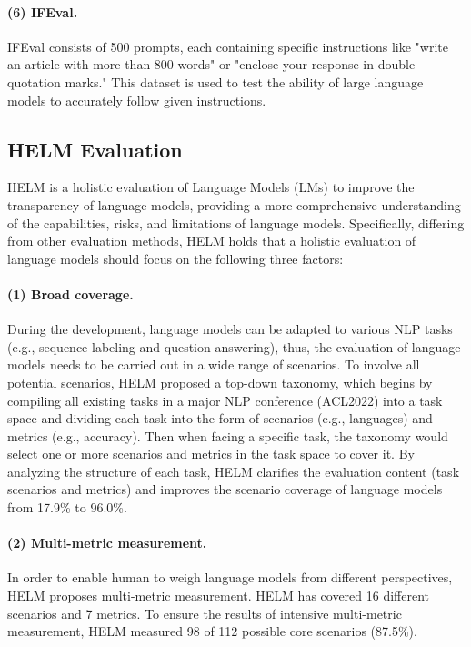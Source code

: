 \documentclass[11pt]{article}
\begin{document}
\paragraph{(6) IFEval.}
IFEval \cite{zhou2023instruction} consists of 500 prompts, each containing specific instructions like "write an article with more than 800 words" or "enclose your response in double quotation marks." This dataset is used to test the ability of large language models to accurately follow given instructions. 





\subsection{HELM Evaluation}
HELM\cite{Liang2022HolisticEO} is a holistic evaluation of Language Models (LMs) to improve the transparency of language models, providing a more comprehensive understanding of the capabilities, risks, and limitations of language models.
Specifically, differing from other evaluation methods, HELM holds that a holistic evaluation of language models should focus on the following three factors:

\paragraph{(1) Broad coverage.} During the development, language models can be adapted to various NLP tasks (e.g., sequence labeling and question answering), thus, the evaluation of language models needs to be carried out in a wide range of scenarios. To involve all potential scenarios, HELM proposed a top-down taxonomy, which begins by compiling all existing tasks in a major NLP conference (ACL2022) into a task space and dividing each task into the form of scenarios (e.g., languages) and metrics (e.g., accuracy). Then when facing a specific task, the taxonomy would select one or more scenarios and metrics in the task space to cover it. By analyzing the structure of each task, HELM clarifies the evaluation content (task scenarios and metrics) and improves the scenario coverage of language models from 17.9\% to 96.0\%.

\paragraph{(2) Multi-metric measurement.} In order to enable human to weigh language models from different perspectives, HELM proposes multi-metric measurement. HELM has covered 16 different scenarios and 7 metrics. To ensure the results of intensive multi-metric measurement, HELM measured 98 of 112 possible core scenarios (87.5\%).
\end{document}
